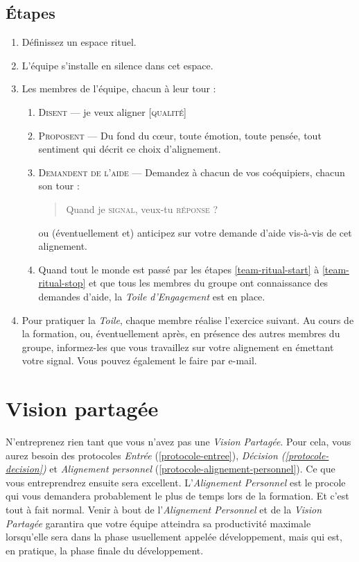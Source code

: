 \documentclass[paper=6in:9in,pagesize=pdftex,headinclude=on,footinclude=on,12pt]{scrbook}
\newcommand*{\numref}[1]{{\hyperref[{#1}]{\autoref*{#1}}}}
\begin{document}
\subsection{Étapes}
\begin{enumerate}
	\item Définissez un espace rituel.
	\item L'équipe s'installe en silence dans cet espace.
	\item Les membres de l'équipe, chacun à leur tour :
	      \begin{enumerate}
	      	\item \label{team-ritual-start} \textsc{Disent} --- \og{}je veux aligner [\textsc{qualité}]\fg{}
	      	\item \textsc{Proposent} --- Du fond du cœur, toute émotion, toute pensée, tout sentiment qui décrit ce choix d'alignement.
	      	\item \label{team-ritual-stop} \textsc{Demandent de l'aide} --- Demandez à chacun de vos coéquipiers, chacun son tour :
	      	      \begin{quote}
	      	      	\og{}Quand je \textsc{signal}, veux-tu \textsc{réponse} ?\fg{}
	      	      \end{quote}
	      	      ou (éventuellement et) anticipez sur votre demande d'aide vis-à-vis de cet alignement.
			\item Quand tout le monde est passé par les étapes \ref{team-ritual-start} à \ref{team-ritual-stop} et que tous les membres
			      du groupe ont connaissance des demandes d'aide, la \emph{Toile d'Engagement} est en place.
	      \end{enumerate}
	\item Pour pratiquer la \emph{Toile}, chaque membre réalise l'exercice suivant. Au cours de la formation, ou, éventuellement après,
	      en présence des autres membres du groupe, informez-les que vous travaillez sur votre alignement en émettant votre signal.
	      Vous pouvez également le faire par e-mail.
\end{enumerate}

\section{Vision partagée} \label{vision-partagee}

N'entreprenez rien tant que vous n'avez pas une \emph{Vision Partagée}. Pour cela, vous aurez besoin des protocoles \emph{Entrée}
(\numref{protocole-entree}), \emph{Décision (\numref{protocole-decision})} et \emph{Alignement personnel} (\numref{protocole-alignement-personnel}).
Ce que vous entreprendrez ensuite sera excellent. L'\emph{Alignement Personnel} est le procole qui vous demandera probablement le plus de
temps lors de la formation. Et c'est tout à fait normal. Venir à bout de l'\emph{Alignement Personnel} et de la \emph{Vision Partagée}
garantira que votre équipe atteindra sa productivité maximale lorsqu'elle sera dans la phase usuellement appelée \og{}développement\fg{},
mais qui est, en pratique, la phase finale du développement.
\end{document}

